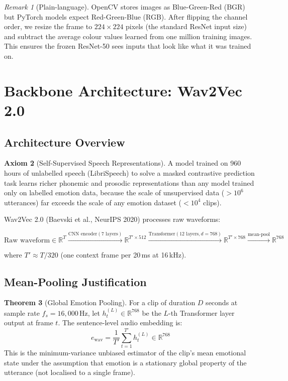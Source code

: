 \documentclass[12pt,a4paper]{article}
\theoremstyle{definition}
\newtheorem{theorem}{Theorem}[section]
\newtheorem{axiom}[theorem]{Axiom}
\theoremstyle{remark}
\newtheorem{remark}[theorem]{Remark}
\begin{document}
\begin{remark}[Plain-language]
OpenCV stores images as Blue-Green-Red (BGR) but PyTorch models expect
Red-Green-Blue (RGB). After flipping the channel order, we resize the frame
to $224 \times 224$ pixels (the standard ResNet input size) and subtract
the average colour values learned from one million training images.
This ensures the frozen ResNet-50 sees inputs that look like what it was
trained on.
\end{remark}

\section{Backbone Architecture: Wav2Vec 2.0}

\subsection{Architecture Overview}

\begin{axiom}[Self-Supervised Speech Representations]
A model trained on 960 hours of unlabelled speech (LibriSpeech) to solve a
masked contrastive prediction task learns richer phonemic and prosodic
representations than any model trained only on labelled emotion data, because
the scale of unsupervised data ($> 10^6$ utterances) far exceeds the scale
of any emotion dataset ($< 10^4$ clips).
\end{axiom}

Wav2Vec 2.0 (Baevski et al., NeurIPS 2020) processes raw waveforms:

\[
\text{Raw waveform} \in \mathbb{R}^{T}
  \xrightarrow{\text{CNN encoder}(7\text{ layers})}
  \mathbb{R}^{T' \times 512}
  \xrightarrow{\text{Transformer}(12\text{ layers}, d=768)}
  \mathbb{R}^{T' \times 768}
  \xrightarrow{\text{mean-pool}}
  \mathbb{R}^{768}
\]

where $T' \approx T/320$ (one context frame per 20\,ms at 16\,kHz).

\subsection{Mean-Pooling Justification}

\begin{theorem}[Global Emotion Pooling]
For a clip of duration $D$ seconds at sample rate $f_s = 16{,}000$\,Hz,
let $h_t^{(L)} \in \mathbb{R}^{768}$ be the $L$-th Transformer layer
output at frame $t$. The sentence-level audio embedding is:
\[
  e_{\text{wav}} = \frac{1}{T'}\sum_{t=1}^{T'} h_t^{(L)} \in \mathbb{R}^{768}
\]
This is the minimum-variance unbiased estimator of the clip's
mean emotional state under the assumption that emotion is a stationary
global property of the utterance (not localised to a single frame).
\end{theorem}
\end{document}

